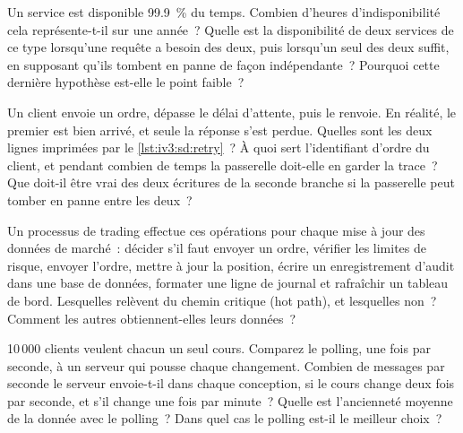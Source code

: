 \begin{question}\label{iq:iv3:system-design:4}
Un service est disponible 99.9~\% du temps. Combien d'heures d'indisponibilité cela représente-t-il sur une année~? Quelle est la disponibilité de deux services de ce type lorsqu'une requête a besoin des deux, puis lorsqu'un seul des deux suffit, en supposant qu'ils tombent en panne de façon indépendante~? Pourquoi cette dernière hypothèse est-elle le point faible~?
\end{question}

\begin{question}\label{iq:iv3:system-design:5}
Un client envoie un ordre, dépasse le délai d'attente, puis le renvoie. En réalité, le premier est bien arrivé, et seule la réponse s'est perdue. Quelles sont les deux lignes imprimées par le \cref{lst:iv3:sd:retry}~? À quoi sert l'identifiant d'ordre du client, et pendant combien de temps la passerelle doit-elle en garder la trace~? Que doit-il être vrai des deux écritures de la seconde branche si la passerelle peut tomber en panne entre les deux~?
\label{lst:iv3:sd:retry}
\end{question}

\begin{question}\label{iq:iv3:system-design:6}
Un processus de trading effectue ces opérations pour chaque mise à jour des données de marché~: décider s'il faut envoyer un ordre, vérifier les limites de risque, envoyer l'ordre, mettre à jour la position, écrire un enregistrement d'audit dans une base de données, formater une ligne de journal et rafraîchir un tableau de bord. Lesquelles relèvent du chemin critique (hot path), et lesquelles non~? Comment les autres obtiennent-elles leurs données~?
\end{question}

\begin{question}\label{iq:iv3:system-design:7}
10\,000 clients veulent chacun un seul cours. Comparez le polling, une fois par seconde, à un serveur qui pousse chaque changement. Combien de messages par seconde le serveur envoie-t-il dans chaque conception, si le cours change deux fois par seconde, et s'il change une fois par minute~? Quelle est l'ancienneté moyenne de la donnée avec le polling~? Dans quel cas le polling est-il le meilleur choix~?
\end{question}

